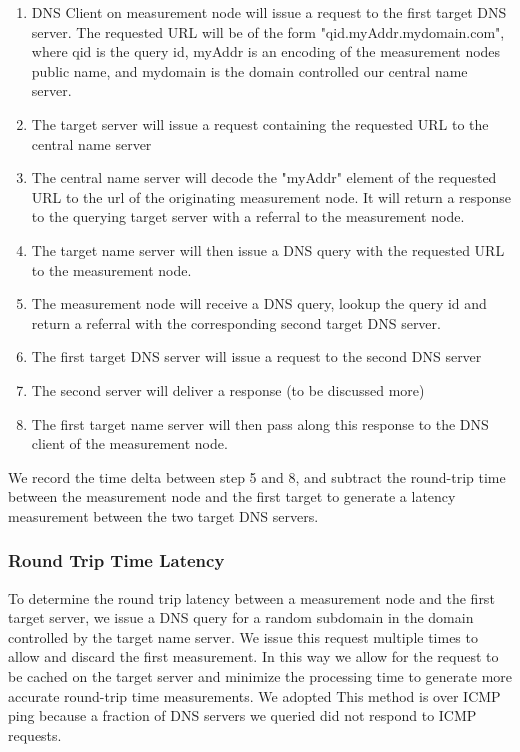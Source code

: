 \begin{enumerate}
	\item DNS Client on measurement node will issue a request to the first target DNS server. The requested URL will be of the form "qid.myAddr.mydomain.com", where qid is the query id, myAddr is an encoding of the measurement nodes public name, and mydomain is the domain controlled our central name server.
	\item The target server will issue a request containing the requested URL to the central name server
	\item The central name server will decode the "myAddr" element of the requested URL to the url of the originating measurement node. It will return a response to the querying target server with a referral to the measurement node.
	\item The target name server will then issue a DNS query with the requested URL to the measurement node.
	\item The measurement node will receive a DNS query, lookup the query id and return a referral with the corresponding second target DNS server.
	\item The first target DNS server will issue a request to the second DNS server
	\item The second server will deliver a response (to be discussed more)
	\item The first target name server will then pass along this response to the DNS client of the measurement node.
\end{enumerate}

We record the time delta between step 5 and 8, and subtract the round-trip time between the measurement node and the first target to generate a latency measurement between the two target DNS servers.

\subsubsection{Round Trip Time Latency}
To determine the round trip latency between a measurement node and the first target server, we issue a DNS query for a random subdomain in the domain controlled by the target name server. We issue this request multiple times to allow and discard the first measurement. In this way we allow for the request to be cached on the target server and minimize the processing time to generate more accurate round-trip time measurements. We adopted This method is over ICMP ping because a fraction of DNS servers we queried did not respond to ICMP requests.

